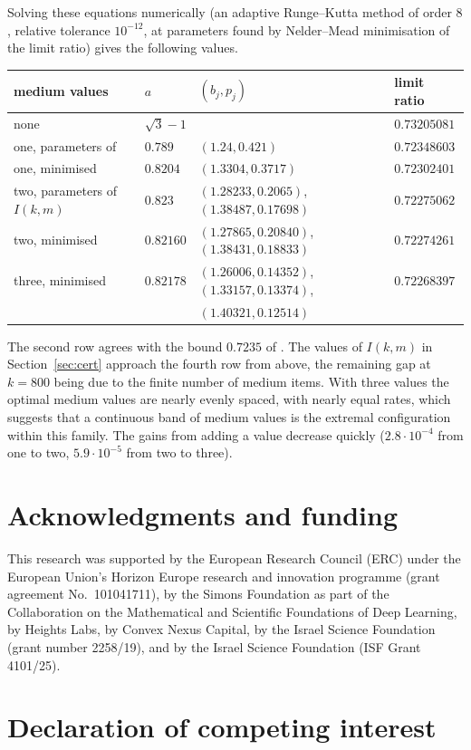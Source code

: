 \documentclass[11pt]{amsart}
\theoremstyle{remark}\newtheorem{remark}[theorem]{Remark}
\begin{document}
Solving these equations numerically (an adaptive Runge--Kutta method of order $8$, relative tolerance $10^{-12}$, at
parameters found by Nelder--Mead minimisation of the limit ratio) gives the following values.
\begin{center}\small
\begin{tabular}{l|l|l|l}
medium values & $a$ & $(b_j,p_j)$ & limit ratio\\\hline
none & $\sqrt3-1$ & & $0.73205081$\\
one, parameters of \cite{gms} & $0.789$ & $(1.24,0.421)$ & $0.72348603$\\
one, minimised & $0.8204$ & $(1.3304,0.3717)$ & $0.72302401$\\
two, parameters of $I(k,m)$ & $0.823$ & $(1.28233,0.2065)$, $(1.38487,0.17698)$ & $0.72275062$\\
two, minimised & $0.82160$ & $(1.27865,0.20840)$, $(1.38431,0.18833)$ & $0.72274261$\\
three, minimised & $0.82178$ & $(1.26006,0.14352)$, $(1.33157,0.13374)$, & $0.72268397$\\
 & & $(1.40321,0.12514)$ &
\end{tabular}
\end{center}
The second row agrees with the bound $0.7235$ of \cite{gms}. The values of $I(k,m)$ in Section~\ref{sec:cert} approach the
fourth row from above, the remaining gap at $k=800$ being due to the finite number of medium items. With three values the
optimal medium values are nearly evenly spaced, with nearly equal rates, which suggests that a continuous band of medium
values is the extremal configuration within this family. The gains from adding a value decrease quickly
($2.8\cdot10^{-4}$ from one to two, $5.9\cdot10^{-5}$ from two to three).

\section*{Acknowledgments and funding}

This research was supported by the European Research Council (ERC) under the European Union's Horizon Europe research and innovation programme (grant agreement No.~101041711), by the Simons Foundation as part of the Collaboration on the Mathematical and Scientific Foundations of Deep Learning, by Heights Labs, by Convex Nexus Capital, by the Israel Science Foundation (grant number 2258/19), and by the Israel Science Foundation (ISF Grant 4101/25).

\section*{Declaration of competing interest}
\end{document}
